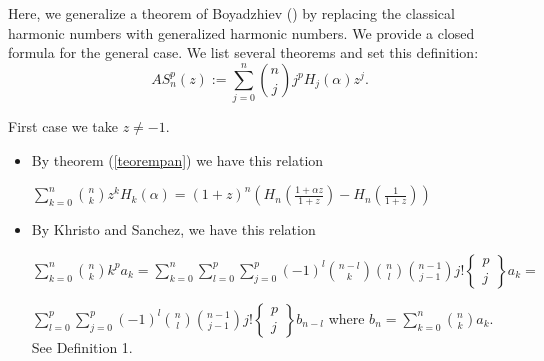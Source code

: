 \documentclass[a4paper,10pt,oneside]{article}
\newcommand{\st}[2]{\mbox{$\left\{\begin{array}{c}{#1}\\{#2} \end{array}\right\}$}}
\theoremstyle{definition}
\theoremstyle{remark}
\begin{document}
 { Here, we generalize a theorem of Boyadzhiev (\cite{khristo3}) by replacing the classical harmonic numbers with generalized harmonic numbers.} We provide a closed formula for the general case. We list several theorems and set this definition:
 \begin{equation}AS_n^p(z):=\sum_{j=0}^n\binom{n}{j}j^p H_j(\alpha)z^j.\label{boyacoff}\end{equation}
 \begin{description}
 \item First case we take $z\ne -1.$
 \begin{itemize}
\item By theorem (\ref{teorempan})   we have  this relation\par  $\sum_{k=0}^n\binom{n}{k}z^kH_k(\alpha)=(1+z)^n\left(H_n(\frac{1+\alpha z}{1+z})-H_n(\frac{1}{1+z})\right)$
 \item By Khristo and Sanchez, we have this relation  \par  
 $\sum_{k=0}^n\binom{n}{k}k^pa_k=\sum_{k=0}^n\sum_{l=0}^p\sum_{j=0}^p(-1)^l\binom{n-l}{k}\binom{n}{l}\binom{n-1}{j-1}j!\st{p}{j}a_k=$\par
$\sum_{l=0}^p\sum_{j=0}^p(-1)^l\binom{n}{l}\binom{n-1}{j-1}j!\st{p}{j}b_{n-l}$ where  $b_n=\sum_{k=0}^n\binom{n}{k} a_k.$ See Definition 1.


\end{itemize}
\end{description}
\end{document}
